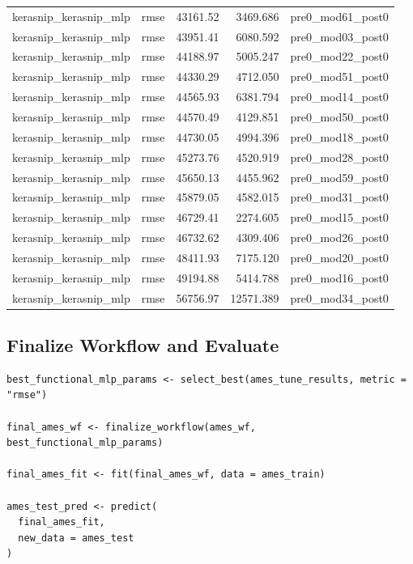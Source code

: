 \begin{table}
\begin{tabular}{llrrl}
kerasnip\_kerasnip\_mlp & rmse & 43161.52 & 3469.686 & pre0\_mod61\_post0\\
kerasnip\_kerasnip\_mlp & rmse & 43951.41 & 6080.592 & pre0\_mod03\_post0\\
kerasnip\_kerasnip\_mlp & rmse & 44188.97 & 5005.247 & pre0\_mod22\_post0\\
\addlinespace
kerasnip\_kerasnip\_mlp & rmse & 44330.29 & 4712.050 & pre0\_mod51\_post0\\
kerasnip\_kerasnip\_mlp & rmse & 44565.93 & 6381.794 & pre0\_mod14\_post0\\
kerasnip\_kerasnip\_mlp & rmse & 44570.49 & 4129.851 & pre0\_mod50\_post0\\
kerasnip\_kerasnip\_mlp & rmse & 44730.05 & 4994.396 & pre0\_mod18\_post0\\
kerasnip\_kerasnip\_mlp & rmse & 45273.76 & 4520.919 & pre0\_mod28\_post0\\
\addlinespace
kerasnip\_kerasnip\_mlp & rmse & 45650.13 & 4455.962 & pre0\_mod59\_post0\\
kerasnip\_kerasnip\_mlp & rmse & 45879.05 & 4582.015 & pre0\_mod31\_post0\\
kerasnip\_kerasnip\_mlp & rmse & 46729.41 & 2274.605 & pre0\_mod15\_post0\\
kerasnip\_kerasnip\_mlp & rmse & 46732.62 & 4309.406 & pre0\_mod26\_post0\\
kerasnip\_kerasnip\_mlp & rmse & 48411.93 & 7175.120 & pre0\_mod20\_post0\\
\addlinespace
kerasnip\_kerasnip\_mlp & rmse & 49194.88 & 5414.788 & pre0\_mod16\_post0\\
kerasnip\_kerasnip\_mlp & rmse & 56756.97 & 12571.389 & pre0\_mod34\_post0\\
\bottomrule
\end{tabular}
\endgroup{}
\end{table}

\subsection{Finalize Workflow and Evaluate}\label{finalize-workflow-and-evaluate}

\begin{verbatim}
best_functional_mlp_params <- select_best(ames_tune_results, metric = "rmse")

final_ames_wf <- finalize_workflow(ames_wf, best_functional_mlp_params)

final_ames_fit <- fit(final_ames_wf, data = ames_train)

ames_test_pred <- predict(
  final_ames_fit,
  new_data = ames_test
)
\end{verbatim}

